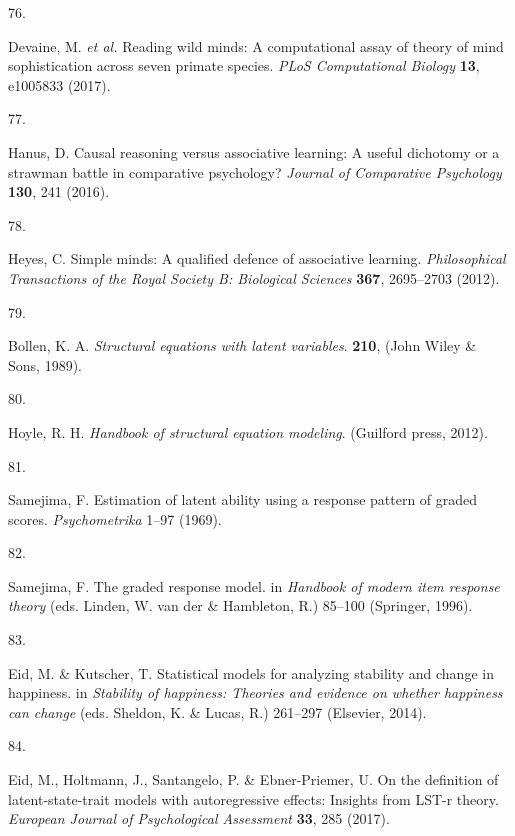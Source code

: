 \documentclass[
  man,floatsintext]{apa6}
\newlength{\cslhangindent}
\newlength{\csllabelwidth}
\newlength{\cslentryspacingunit} %
\newenvironment{CSLReferences}[2] %
 {%
  \setlength{\parindent}{0pt}
  \ifodd #1
  \let\oldpar\par
  \def\par{\hangindent=\cslhangindent\oldpar}
  \fi
  \setlength{\parskip}{#2\cslentryspacingunit}
 }%
 {}
\newcommand{\CSLLeftMargin}[1]{\parbox[t]{\csllabelwidth}{#1}}
\newcommand{\CSLRightInline}[1]{\parbox[t]{\linewidth - \csllabelwidth}{#1}\break}
\begin{document}
\begin{CSLReferences}{0}{0}
\leavevmode{}%
\CSLLeftMargin{76. }%
\CSLRightInline{Devaine, M. \emph{et al.} Reading wild minds: A computational assay of theory of mind sophistication across seven primate species. \emph{PLoS Computational Biology} \textbf{13}, e1005833 (2017).}

\leavevmode{}%
\CSLLeftMargin{77. }%
\CSLRightInline{Hanus, D. Causal reasoning versus associative learning: A useful dichotomy or a strawman battle in comparative psychology? \emph{Journal of Comparative Psychology} \textbf{130}, 241 (2016).}

\leavevmode{}%
\CSLLeftMargin{78. }%
\CSLRightInline{Heyes, C. Simple minds: A qualified defence of associative learning. \emph{Philosophical Transactions of the Royal Society B: Biological Sciences} \textbf{367}, 2695--2703 (2012).}

\leavevmode{}%
\CSLLeftMargin{79. }%
\CSLRightInline{Bollen, K. A. \emph{Structural equations with latent variables}. \textbf{210}, (John Wiley \& Sons, 1989).}

\leavevmode{}%
\CSLLeftMargin{80. }%
\CSLRightInline{Hoyle, R. H. \emph{Handbook of structural equation modeling}. (Guilford press, 2012).}

\leavevmode{}%
\CSLLeftMargin{81. }%
\CSLRightInline{Samejima, F. Estimation of latent ability using a response pattern of graded scores. \emph{Psychometrika} 1--97 (1969).}

\leavevmode{}%
\CSLLeftMargin{82. }%
\CSLRightInline{Samejima, F. The graded response model. in \emph{Handbook of modern item response theory} (eds. Linden, W. van der \& Hambleton, R.) 85--100 (Springer, 1996).}

\leavevmode{}%
\CSLLeftMargin{83. }%
\CSLRightInline{Eid, M. \& Kutscher, T. Statistical models for analyzing stability and change in happiness. in \emph{Stability of happiness: Theories and evidence on whether happiness can change} (eds. Sheldon, K. \& Lucas, R.) 261--297 (Elsevier, 2014).}

\leavevmode{}%
\CSLLeftMargin{84. }%
\CSLRightInline{Eid, M., Holtmann, J., Santangelo, P. \& Ebner-Priemer, U. On the definition of latent-state-trait models with autoregressive effects: Insights from LST-r theory. \emph{European Journal of Psychological Assessment} \textbf{33}, 285 (2017).}


\end{CSLReferences}
\end{document}
